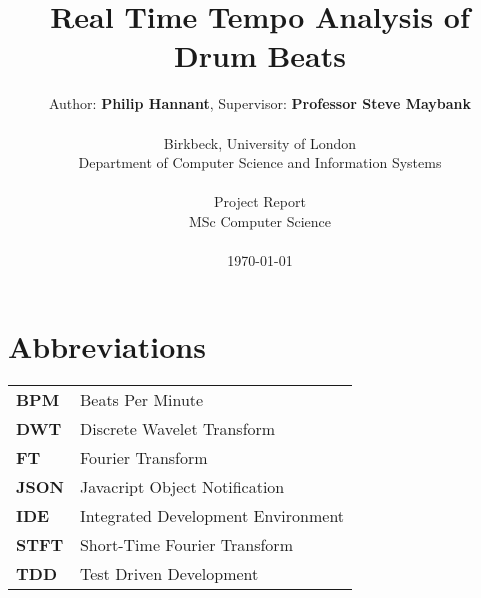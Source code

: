 \documentclass[a4paper, 11pt]{article}
\date{}
\begin{document}
 

\LARGE\title{Real Time Tempo Analysis of Drum Beats}

\LARGE\author{Author: \textbf{Philip Hannant}, Supervisor: \textbf{Professor Steve Maybank}\\
\\Birkbeck, University of London\\
Department of Computer Science and Information Systems\\
\\Project Report\\
MSc Computer Science\\
\\\monthyeardate\today
}





\normalsize


\maketitle
\newpage
\tableofcontents
\clearpage

\section*{Abbreviations}
\begin{tabular}{l p{4.5in}  }\\
\textbf{BPM} & Beats Per Minute\\
\textbf{DWT} & Discrete Wavelet Transform\\
\textbf{FT} & Fourier Transform\\
\textbf{JSON} & Javacript Object Notification\\
\textbf{IDE} & Integrated Development Environment\\
\textbf{STFT} & Short-Time Fourier Transform\\
\textbf{TDD} & Test Driven Development\\
\end{tabular}
\end{document}
